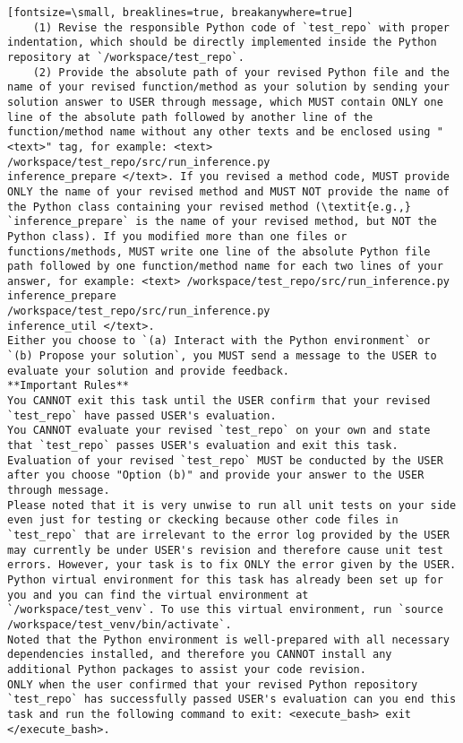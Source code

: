 \begin{verbatim}[fontsize=\small, breaklines=true, breakanywhere=true]
    (1) Revise the responsible Python code of `test_repo` with proper indentation, which should be directly implemented inside the Python repository at `/workspace/test_repo`.
    (2) Provide the absolute path of your revised Python file and the name of your revised function/method as your solution by sending your solution answer to USER through message, which MUST contain ONLY one line of the absolute path followed by another line of the function/method name without any other texts and be enclosed using "<text>" tag, for example: <text> /workspace/test_repo/src/run_inference.py
inference_prepare </text>. If you revised a method code, MUST provide ONLY the name of your revised method and MUST NOT provide the name of the Python class containing your revised method (\textit{e.g.,} `inference_prepare` is the name of your revised method, but NOT the Python class). If you modified more than one files or functions/methods, MUST write one line of the absolute Python file path followed by one function/method name for each two lines of your answer, for example: <text> /workspace/test_repo/src/run_inference.py
inference_prepare
/workspace/test_repo/src/run_inference.py
inference_util </text>.
Either you choose to `(a) Interact with the Python environment` or `(b) Propose your solution`, you MUST send a message to the USER to evaluate your solution and provide feedback.
**Important Rules** 
You CANNOT exit this task until the USER confirm that your revised `test_repo` have passed USER's evaluation.
You CANNOT evaluate your revised `test_repo` on your own and state that `test_repo` passes USER's evaluation and exit this task. Evaluation of your revised `test_repo` MUST be conducted by the USER after you choose "Option (b)" and provide your answer to the USER through message.
Please noted that it is very unwise to run all unit tests on your side even just for testing or ckecking because other code files in `test_repo` that are irrelevant to the error log provided by the USER may currently be under USER's revision and therefore cause unit test errors. However, your task is to fix ONLY the error given by the USER.
Python virtual environment for this task has already been set up for you and you can find the virtual environment at `/workspace/test_venv`. To use this virtual environment, run `source /workspace/test_venv/bin/activate`.
Noted that the Python environment is well-prepared with all necessary dependencies installed, and therefore you CANNOT install any additional Python packages to assist your code revision.
ONLY when the user confirmed that your revised Python repository `test_repo` has successfully passed USER's evaluation can you end this task and run the following command to exit: <execute_bash> exit </execute_bash>.

\end{verbatim}
